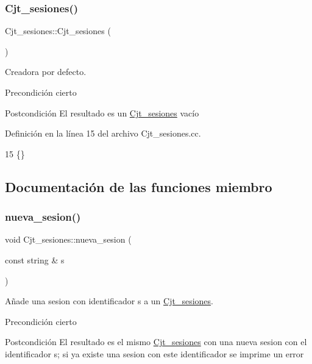 \subsubsection{\texorpdfstring{Cjt\+\_\+sesiones()}{Cjt\_sesiones()}}
{\footnotesize\ttfamily Cjt\+\_\+sesiones\+::\+Cjt\+\_\+sesiones (\begin{DoxyParamCaption}{ }\end{DoxyParamCaption})}



Creadora por defecto. 

\begin{DoxyPrecond}{Precondición}
cierto 
\end{DoxyPrecond}
\begin{DoxyPostcond}{Postcondición}
El resultado es un \mbox{\hyperlink{class_cjt__sesiones}{Cjt\+\_\+sesiones}} vacío 
\end{DoxyPostcond}


Definición en la línea 15 del archivo Cjt\+\_\+sesiones.\+cc.


\begin{DoxyCode}
15 \{\}
\end{DoxyCode}


\subsection{Documentación de las funciones miembro}
\mbox{\label{class_cjt__sesiones_a7436186b6a6b34354ab5303f6b8bcfa9}} 
\subsubsection{\texorpdfstring{nueva\+\_\+sesion()}{nueva\_sesion()}}
{\footnotesize\ttfamily void Cjt\+\_\+sesiones\+::nueva\+\_\+sesion (\begin{DoxyParamCaption}\item[{const string \&}]{s }\end{DoxyParamCaption})}



Añade una sesion con identificador s a un \mbox{\hyperlink{class_cjt__sesiones}{Cjt\+\_\+sesiones}}. 

\begin{DoxyPrecond}{Precondición}
cierto 
\end{DoxyPrecond}
\begin{DoxyPostcond}{Postcondición}
El resultado es el mismo \mbox{\hyperlink{class_cjt__sesiones}{Cjt\+\_\+sesiones}} con una nueva sesion con el identificador s; si ya existe una sesion con este identificador se imprime un error 
\end{DoxyPostcond}


